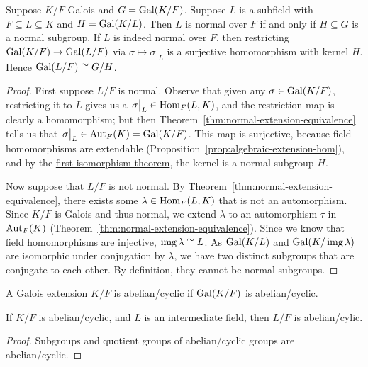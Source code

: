 \begin{theorem}\label{thm:normal-galois}
    Suppose \(K/F\) Galois and \(G = \operatorname{Gal}(K/F)\).
    Suppose \(L\) is a subfield with \(F \subseteq L \subseteq K\) and \(H = \operatorname{Gal}(K/L)\).
    Then \(L\) is normal over \(F\) if and only if \(H \subseteq G\) is a normal subgroup.
    If \(L\) is indeed normal over \(F\),
    then restricting \(\operatorname{Gal}(K/F) \to \operatorname{Gal}(L/F)\) via \(\sigma \mapsto \sigma\vert_L\)
    is a surjective homomorphism with kernel \(H\).
    Hence \(\operatorname{Gal}(L/F) \cong G/H\).
\end{theorem}
\begin{proof}
    First suppose \(L/F\) is normal.
    Observe that given any \(\sigma \in \operatorname{Gal}(K/F)\),
    restricting it to \(L\) gives us a \(\eval{\sigma}_L \in \Hom_F(L,K)\),
    and the restriction map is clearly a homomorphism;
    but then Theorem~\ref{thm:normal-extension-equivalence} tells us that
    \(\eval{\sigma}_L \in \Aut_F(K) = \Gal(K/F)\).
    This map is surjective, because field homomorphisms are extendable
    (Proposition~\ref{prop:algebraic-extension-hom}),
    and by the \hyperref[thm:iso-1-group]{first isomorphism theorem},
    the kernel is a normal subgroup \(H\).

    Now suppose that \(L/F\) is not normal.
    By Theorem~\ref{thm:normal-extension-equivalence},
    there exists some \(\lambda \in \operatorname{Hom}_F(L,K)\) that is not an automorphism.
    Since \(K/F\) is Galois and thus normal,
    we extend \(\lambda\) to an automorphism \(\tau\) in \(\operatorname{Aut}_F(K)\)
    (Theorem~\ref{thm:normal-extension-equivalence}).
    Since we know that field homomorphisms are injective, \(\operatorname{img}\lambda \cong L\).
    As \(\operatorname{Gal}(K/L)\) and \(\operatorname{Gal}(K/\operatorname{img}\lambda)\) are isomorphic under conjugation by \(\lambda\),
    we have two distinct subgroups that are conjugate to each other.
    By definition, they cannot be normal subgroups.
\end{proof}

\begin{definition}
    A Galois extension \(K/F\) is abelian/cyclic
    if \(\operatorname{Gal}(K/F)\) is abelian/cyclic.
\end{definition}
\begin{proposition}
    If \(K/F\) is abelian/cyclic, and \(L\) is an intermediate field,
    then \(L/F\) is abelian/cylic.
\end{proposition}
\begin{proof}
    Subgroups and quotient groups of abelian/cyclic groups are abelian/cyclic.
\end{proof}

